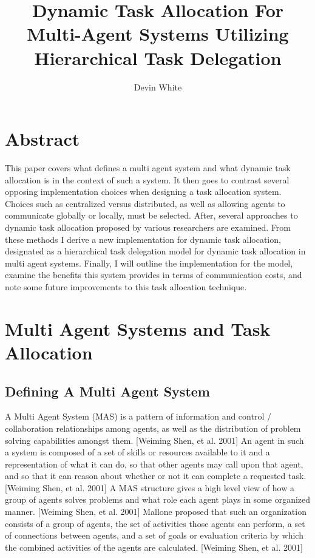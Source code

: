 \documentclass[12pt,letterpaper,onecolumn]{article}
\author{Devin White}
\title{Dynamic Task Allocation For Multi-Agent Systems Utilizing Hierarchical Task Delegation}
\begin{document}
	\begin{titlepage}
		\maketitle
	\end{titlepage}
	\begin{titlepage}
		\tableofcontents
	\end{titlepage}
	\section{Abstract}
	This paper covers what defines a multi agent system and what dynamic task allocation is in the context of such a system. It then goes to contrast several opposing implementation choices when designing a task allocation system. Choices such as centralized versus distributed, as well as allowing agents to communicate globally or locally, must be selected. After, several approaches to dynamic task allocation proposed by various researchers are examined. From these methods I derive a new implementation for dynamic task allocation, designated as a hierarchical task delegation model for dynamic task allocation in multi agent systems. Finally, I will outline the implementation for the model, examine the benefits this system provides in terms of communication costs, and note some future improvements to this task allocation technique.
	\section{Multi Agent Systems and Task Allocation}
	\subsection{Defining A Multi Agent System}
	A Multi Agent System (MAS) is a pattern of information and control / collaboration relationships among agents, as well as the distribution of problem solving capabilities amongst them. [Weiming Shen, et al. 2001] An agent in such a system is composed of a set of skills or resources available to it and a representation of what it can do, so that other agents may call upon that agent, and so that it can reason about whether or not it can complete a requested task. [Weiming Shen, et al. 2001] A MAS structure gives a high level view of how a group of agents solves problems and what role each agent plays in some organized manner. [Weiming Shen, et al. 2001] Mallone proposed that such an organization consists of a group of agents, the set of activities those agents can perform, a set of connections between agents, and a set of goals or evaluation criteria by which the combined activities of the agents are calculated. [Weiming Shen, et al. 2001]
\end{document}
